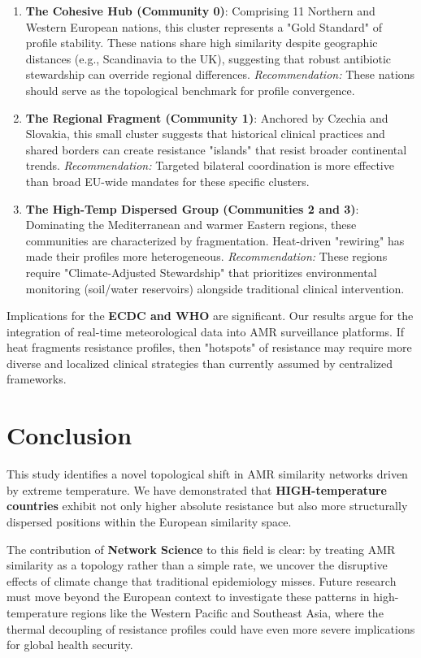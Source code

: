 \documentclass[11pt,a4paper]{article}
\begin{document}
\begin{enumerate}
    \item \textbf{The Cohesive Hub (Community 0)}: Comprising 11 Northern and Western European nations, this cluster represents a "Gold Standard" of profile stability. These nations share high similarity despite geographic distances (e.g., Scandinavia to the UK), suggesting that robust antibiotic stewardship can override regional differences. \textit{Recommendation:} These nations should serve as the topological benchmark for profile convergence.
    \item \textbf{The Regional Fragment (Community 1)}: Anchored by Czechia and Slovakia, this small cluster suggests that historical clinical practices and shared borders can create resistance "islands" that resist broader continental trends. \textit{Recommendation:} Targeted bilateral coordination is more effective than broad EU-wide mandates for these specific clusters.
    \item \textbf{The High-Temp Dispersed Group (Communities 2 and 3)}: Dominating the Mediterranean and warmer Eastern regions, these communities are characterized by fragmentation. Heat-driven "rewiring" has made their profiles more heterogeneous. \textit{Recommendation:} These regions require "Climate-Adjusted Stewardship" that prioritizes environmental monitoring (soil/water reservoirs) alongside traditional clinical intervention.
\end{enumerate}

Implications for the \textbf{ECDC and WHO} are significant. Our results argue for the integration of real-time meteorological data into AMR surveillance platforms. If heat fragments resistance profiles, then "hotspots" of resistance may require more diverse and localized clinical strategies than currently assumed by centralized frameworks.

\section{Conclusion} \label{conc}
This study identifies a novel topological shift in AMR similarity networks driven by extreme temperature. We have demonstrated that \textbf{HIGH-temperature countries} exhibit not only higher absolute resistance but also more structurally dispersed positions within the European similarity space.

The contribution of \textbf{Network Science} to this field is clear: by treating AMR similarity as a topology rather than a simple rate, we uncover the disruptive effects of climate change that traditional epidemiology misses. Future research must move beyond the European context to investigate these patterns in high-temperature regions like the Western Pacific and Southeast Asia, where the thermal decoupling of resistance profiles could have even more severe implications for global health security.



\end{document}
